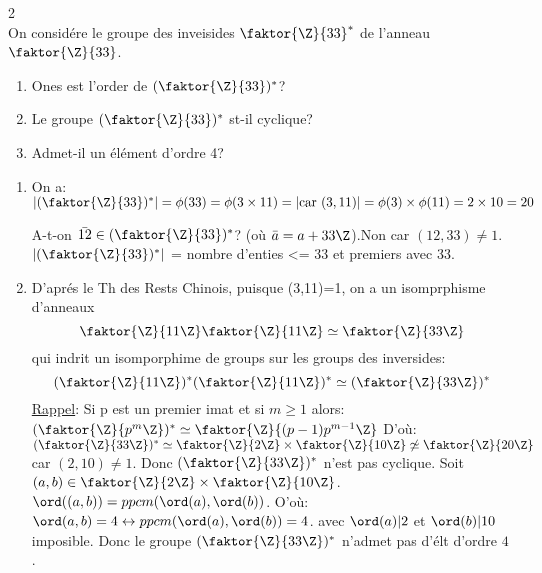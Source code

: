 \begin{examplebox}
	2\\
	On considére le groupe des inveisides $\faktor{\Z}{33}^*$ de l'anneau $\faktor{\Z}{33}$.
	\begin{enumerate}
		\item Ones est l'order de $(\faktor{\Z}{33})^*$?
		\item Le groupe $(\faktor{\Z}{33})^*$ st-il cyclique?
		\item Admet-il un élément d'ordre 4?
	\end{enumerate}
	\begin{enumerate}
		\item On a: $|(\faktor{\Z}{33})^*|=\phi(33)=\phi(3\times 11)=|\text{car $(3,11)$}|=\phi(3)\times\phi(11)=2\times 10=20$
		\begin{remark}
			A-t-on $\bar{12}\in (\faktor{\Z}{33})^*$? (où $\bar{a}=a+33\Z$).Non car $(12, 33)\neq 1$.
			$|(\faktor{\Z}{33})^*|$ = nombre d'enties <= 33 et premiers avec 33.
		\end{remark}
		
		\item D'aprés le Th des Rests Chinois, puisque (3,11)=1, on a un isomprphisme d'anneaux 
			$$\faktor{\Z}{11\Z}\faktor{\Z}{11\Z}\simeq\faktor{\Z}{33\Z}$$
		qui indrit un isomporphime de groups sur les groups des inversides:
		$$(\faktor{\Z}{11\Z})^*(\faktor{\Z}{11\Z})^*\simeq(\faktor{\Z}{33\Z})^*$$
		\underline{Rappel}: Si p est un premier imat et si $m\geq 1$ alors: $(\faktor{\Z}{p^m\Z})^*\simeq\faktor{\Z}{(p-1)p^{m-1}\Z}$
		D'où: $(\faktor{\Z}{33\Z})^*\simeq \faktor{\Z}{2\Z}\times \faktor{\Z}{10\Z}\not\simeq \faktor{\Z}{20\Z}$ car $(2,10)\neq 1$. Donc $(\faktor{\Z}{33\Z})^*$ n'est pas cyclique.
		Soit $(a,b)\in \faktor{\Z}{2\Z}\times\faktor{\Z}{10\Z}$. $\ord((a,b))=ppcm(\ord(a), \ord(b))$. O'où: $\ord(a,b)=4 \leftrightarrow ppcm(\ord(a), \ord(b))=4$.
		avec $\ord(a)|2$ et $\ord(b)|10$ imposible. Donc le groupe $(\faktor{\Z}{33\Z})^*$ n'admet pas d'élt d'ordre $4$.
	\end{enumerate}
\end{examplebox}


